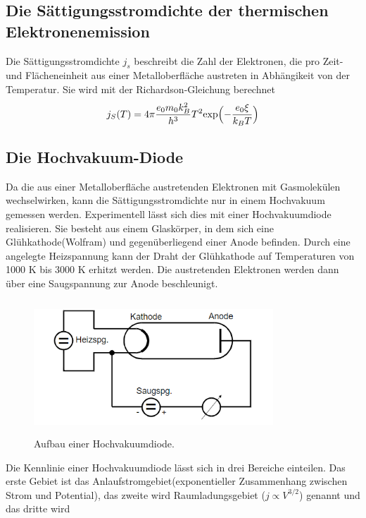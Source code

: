 \subsection{Die Sättigungsstromdichte der thermischen Elektronenemission}
Die Sättigungsstromdichte $j_s$ beschreibt die Zahl der Elektronen, die pro Zeit- und
Flächeneinheit aus einer Metalloberfläche austreten in Abhängikeit von der Temperatur.
Sie wird mit der Richardson-Gleichung berechnet
\begin{equation}
    j_S(T)=4\pi \frac{e_0m_0k^2_B}{h^3}T^2 \text{exp}\Bigl(-\frac{e_0\xi}{k_BT}\Bigr)\\
    \end{equation}
\subsection{Die Hochvakuum-Diode}
Da die aus einer Metalloberfläche austretenden Elektronen mit Gasmolekülen wechselwirken, kann die Sättigungsstromdichte nur in einem Hochvakuum gemessen werden.
Experimentell lässt sich dies mit einer Hochvakuumdiode realisieren. Sie besteht aus
einem Glaskörper, in dem sich eine Glühkathode(Wolfram) und gegenüberliegend einer
Anode befinden. Durch eine angelegte Heizspannung kann der Draht der Glühkathode
auf Temperaturen von 1000 K bis 3000 K erhitzt werden. Die austretenden Elektronen
werden dann über eine Saugspannung zur Anode beschleunigt.
\begin{figure}[H]
    \begin{center}
    \includegraphics[width = 9cm, height= 5cm]{Hochvakuumdiode.png}
    \caption{Aufbau einer Hochvakuumdiode.\protect\cite{AL}}
    \end{center}
    \label{fig:Hochvakuumdiode}
    \end{figure}
    \noindent
Die Kennlinie einer Hochvakuumdiode lässt sich in drei Bereiche einteilen. Das erste
Gebiet ist das Anlaufstromgebiet(exponentieller Zusammenhang zwischen Strom und
Potential), das zweite wird Raumladungsgebiet ($j \propto V^{3/2}$) genannt und das dritte wird
